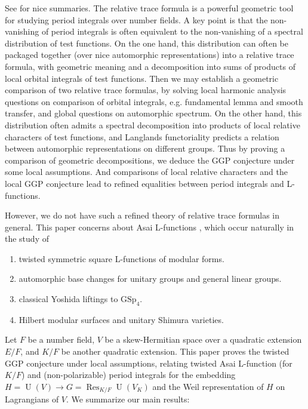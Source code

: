 \documentclass[11pt, reqno]{amsart}
\numberwithin{equation}{subsection}
\theoremstyle{plain}
\theoremstyle{definition}
\DeclareMathOperator{\Res}{Res}
\DeclareMathOperator{\U}{U}
\begin{document}
See \cite{Zhang2018ICM,gross2022road,BP2022ICM,AGGP-survey-2024} for nice summaries. The relative trace formula is a powerful geometric tool for studying period integrals over number fields. A key point is that the non-vanishing of period integrals is often equivalent to the non-vanishing of a spectral distribution of test functions. On the one hand, this distribution can often be packaged together (over nice automorphic representations) into a relative trace formula, with geometric meaning and a decomposition into sums of products of local orbital integrals of test functions. Then we may establish a geometric comparison of two relative trace formulas, by solving local harmonic analysis questions on comparison of orbital integrals, e.g. fundamental lemma and smooth transfer, and global questions on automorphic spectrum. On the other hand, this distribution often admits a spectral decomposition into products of local relative characters of test functions, and Langlands functoriality predicts a relation between automorphic representations on different groups. Thus by proving a comparison of geometric decompositions, we deduce the GGP conjecture under some local assumptions. And comparisons of local relative characters and the local GGP conjecture lead to refined equalities between period integrals and L-functions.


However, we do not have such a refined theory of relative trace formulas in general. This paper concerns about Asai L-functions \cite{Asai1977,Flicker}, which occur naturally in the study of
\begin{enumerate}
    \item twisted symmetric square L-functions of modular forms.
    \item automorphic base changes for unitary groups and general linear groups.
    \item classical Yoshida liftings to $\mathrm{GSp}_4$.
    \item Hilbert modular surfaces and unitary Shimura varieties.
\end{enumerate}

Let $F$ be a number field, $V$ be a skew-Hermitian space over a quadratic extension $E/F$, and $K/F$ be another quadratic extension. This paper proves the twisted GGP conjecture \cite{TwistedGGP} under local assumptions, relating twisted Asai L-function (for $K/F$) and (non-polarizable) period integrals for the embedding $H=\U(V) \to G=\Res_{K/F} \U(V_K)$ and the Weil representation of $H$ on Lagrangians of $V$. We summarize our main results:
\end{document}
